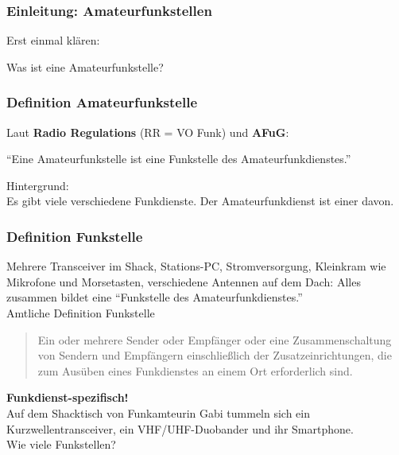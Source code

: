 \begin{frame}
  \frametitle{Einleitung: Amateurfunkstellen}

  Erst einmal klären:

  \begin{center}
    \Large{Was ist eine Amateurfunkstelle?}
  \end{center}

\end{frame}

\begin{frame}
  \frametitle{Definition Amateurfunkstelle}

  Laut \textbf{Radio Regulations} (RR = VO Funk) und \textbf{AFuG}:

  \begin{center}
    ``Eine Amateurfunkstelle ist eine Funkstelle des Amateurfunkdienstes.''\\[1em]
  \end{center}

  Hintergrund: \\
  Es gibt viele verschiedene Funkdienste. Der Amateurfunkdienst ist einer davon.\\[2em]


\end{frame}

\begin{frame}
  \frametitle{Definition Funkstelle}

  Mehrere Transceiver im Shack, Stations-PC, Stromversorgung, Kleinkram wie
  Mikrofone und Morsetasten, verschiedene Antennen auf dem Dach: Alles
  zusammen bildet eine ``Funkstelle des Amateurfunkdienstes.''\\[2em]

  Amtliche Definition Funkstelle\\[1em]

  \begin{quote}
    Ein oder mehrere Sender oder Empfänger oder eine Zusammenschaltung von
    Sendern und Empfängern einschließlich der Zusatzeinrichtungen, die zum
    Ausüben eines Funkdienstes an einem Ort erforderlich sind.
  \end{quote}

\end{frame}

\begin{frame}


    {\Large \textbf{Funkdienst-spezifisch!}}\\[1em]

    Auf dem Shacktisch von Funkamteurin Gabi tummeln sich ein
    Kurzwellentransceiver, ein VHF/UHF-Duobander und ihr Smartphone.\\[1em]

    Wie viele Funkstellen?\\[1em]

\end{frame}

